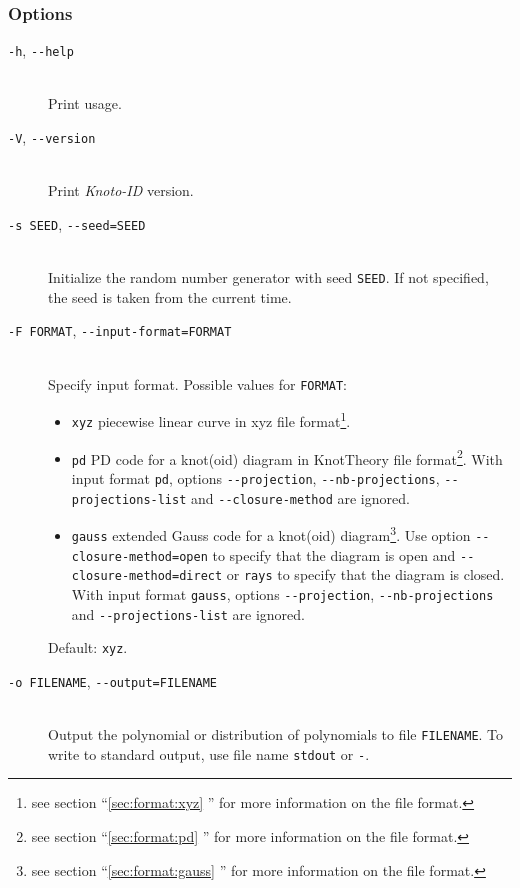 \subsubsection{Options}
\begin{description}
\item[\lstinline{-h}, \lstinline{--help}]\hfill\\
  Print usage.
\item[\lstinline{-V}, \lstinline{--version}]\hfill\\
  Print {\it Knoto-ID} version.
\item[\lstinline{-s SEED}, \lstinline{--seed=SEED}]\hfill\\
  Initialize the random number generator with  seed \lstinline{SEED}. If not specified, the seed is taken from the current time. 
\item[\lstinline{-F FORMAT}, \lstinline{--input-format=FORMAT}]\hfill\\
  Specify input format. Possible values for \lstinline{FORMAT}:
  \begin{itemize}
    \item \lstinline{xyz} piecewise linear curve in xyz file format\footnote{see section ``\ref{sec:format:xyz} '' for more information on the file format.}.
    \item \lstinline{pd} PD code for a knot(oid) diagram in KnotTheory file format\footnote{see section ``\ref{sec:format:pd} ''  for more information on the file format.}.  With input format \lstinline{pd}, options \lstinline{--projection}, \lstinline{--nb-projections}, \lstinline{--projections-list} and  \lstinline{--closure-method} are ignored. 
    \item \lstinline{gauss} extended Gauss code for a knot(oid) diagram\footnote{see section ``\ref{sec:format:gauss} ''  for more information on the file format.}. Use option \lstinline{--closure-method=open} to specify that the diagram is open and \lstinline{--closure-method=direct} or \lstinline{rays} to specify that the diagram is  closed. With input format \lstinline{gauss}, options \lstinline{--projection}, \lstinline{--nb-projections} and \lstinline{--projections-list} are ignored. 
  \end{itemize}
  Default: \lstinline{xyz}.
\item[\lstinline{-o FILENAME}, \lstinline{--output=FILENAME}]\hfill\\
  Output the polynomial or distribution of polynomials to file \lstinline{FILENAME}.  To write to standard output, use file name \lstinline{stdout} or \lstinline{-}.\\

\end{description}
